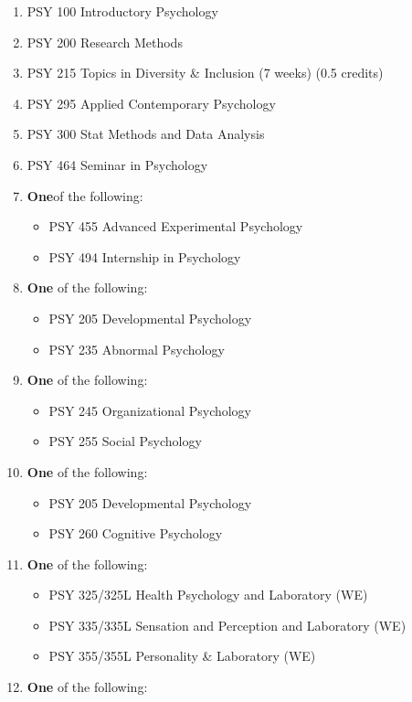 \documentclass[
  letterpaper,
]{scrbook}
\providecommand{\tightlist}{%
  \setlength{\itemsep}{0pt}\setlength{\parskip}{0pt}}
\begin{document}
\begin{enumerate}
\def\labelenumi{\arabic{enumi}.}
\item
  PSY 100 Introductory Psychology
\item
  PSY 200 Research Methods
\item
  PSY 215 Topics in Diversity \& Inclusion (7 weeks) (0.5 credits)
\item
  PSY 295 Applied Contemporary Psychology
\item
  PSY 300 Stat Methods and Data Analysis
\item
  PSY 464 Seminar in Psychology
\item
  \textbf{One}of the following:

  \begin{itemize}
  \tightlist
  \item
    PSY 455 Advanced Experimental Psychology
  \item
    PSY 494 Internship in Psychology
  \end{itemize}
\item
  \textbf{One} of the following:

  \begin{itemize}
  \tightlist
  \item
    PSY 205 Developmental Psychology
  \item
    PSY 235 Abnormal Psychology
  \end{itemize}
\item
  \textbf{One} of the following:

  \begin{itemize}
  \tightlist
  \item
    PSY 245 Organizational Psychology
  \item
    PSY 255 Social Psychology
  \end{itemize}
\item
  \textbf{One} of the following:

  \begin{itemize}
  \tightlist
  \item
    PSY 205 Developmental Psychology
  \item
    PSY 260 Cognitive Psychology
  \end{itemize}
\item
  \textbf{One} of the following:

  \begin{itemize}
  \tightlist
  \item
    PSY 325/325L Health Psychology and Laboratory (WE)
  \item
    PSY 335/335L Sensation and Perception and Laboratory (WE)
  \item
    PSY 355/355L Personality \& Laboratory (WE)
  \end{itemize}
\item
  \textbf{One} of the following:


\end{enumerate}
\end{document}
